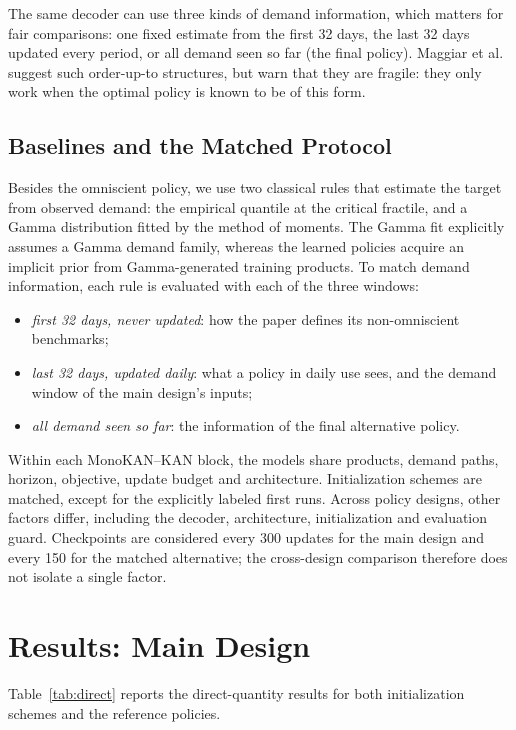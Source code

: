 \documentclass[conference]{IEEEtran}
\begin{document}
The same decoder can use three kinds of demand information, which matters for fair comparisons: one fixed estimate
from the first 32 days, the last 32 days updated every period, or all demand seen so far (the final policy). Maggiar
et al.~\cite[Sec.~5.3.1]{maggiar2025} suggest such order-up-to structures, but warn that they are fragile: they only
work when the optimal policy is known to be of this form.

\subsection{Baselines and the Matched Protocol}\label{sec:protocol}
Besides the omniscient policy, we use two classical rules that estimate the target from observed demand: the
empirical quantile at the critical fractile, and a Gamma distribution fitted by the method of moments. The Gamma fit
explicitly assumes a Gamma demand family, whereas the learned policies acquire an implicit prior from Gamma-generated
training products. To match demand information, each rule is evaluated with each of the three windows:
\begin{itemize}
\item \textit{first 32 days, never updated}: how the paper defines its non-omniscient benchmarks;
\item \textit{last 32 days, updated daily}: what a policy in daily use sees, and the demand window of the main
design's inputs;
\item \textit{all demand seen so far}: the information of the final alternative policy.
\end{itemize}
Within each MonoKAN--KAN block, the models share products, demand paths, horizon, objective, update budget and
architecture. Initialization schemes are matched, except for the explicitly labeled first runs. Across policy designs,
other factors differ, including the decoder, architecture, initialization and evaluation guard. Checkpoints are
considered every 300 updates for the main design and every 150 for the matched alternative; the cross-design
comparison therefore does not isolate a single factor.

\section{Results: Main Design}\label{sec:results-main}
Table~\ref{tab:direct} reports the direct-quantity results for both initialization schemes and the reference policies.
\end{document}
